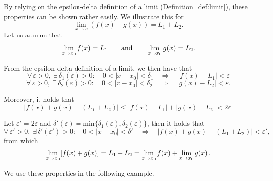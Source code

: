\ifcourse
\ifanalysis

By relying on the epsilon-delta definition of a limit (Definition~\ref{def:limit}), these properties can be shown rather easily. We illustrate this for
$$
\displaystyle \lim_{x\to c}(f(x)+ g(x)) = L_1+ L_2.
$$
Let us assume that 
\[ \displaystyle\lim_{x\rightarrow x_0}f(x)=L_1 \qquad \mbox{and} \qquad \displaystyle\lim_{x\rightarrow x_0}g(x)=L_2 .\]

From the epsilon-delta definition of a limit, we then have that
\[  \forall \, \varepsilon >0 , \; \exists \, \delta_1(\varepsilon)>0 : \quad 0<|x-x_0|<\delta_1 \quad \Rightarrow \quad |f(x)-L_1|<\varepsilon \]
\[ \forall \, \varepsilon >0 , \; \exists \, \delta_2(\varepsilon)>0 : \quad 0<|x-x_0|<\delta_2 \quad \Rightarrow \quad |g(x)-L_2|<\varepsilon .\]

Moreover, it holds that
\[ |f(x)+g(x)-(L_1+L_2)|\leq|f(x)-L_1|+|g(x)-L_2|<2\varepsilon .\]

Let $\varepsilon'=2\varepsilon$ and $\delta'(\varepsilon)=\mbox{min}\{\delta_1(\varepsilon),\delta_2(\varepsilon)\}$, then it holds that
\[\forall \, \varepsilon'>0, \; \exists \, \delta'(\varepsilon')>0: \quad 0<|x-x_0|<\delta' \quad \Rightarrow \quad |f(x)+g(x)-(L_1+L_2)|<\varepsilon' ,\]
from which
\[ \displaystyle\lim_{x\rightarrow x_0} [f(x)+g(x)]=L_1+L_2=\displaystyle\lim_{x\rightarrow x_0}f(x) +\displaystyle\lim_{x\rightarrow x_0}g(x) \, .\]

\fi
\fi

We use these properties in the following example.


